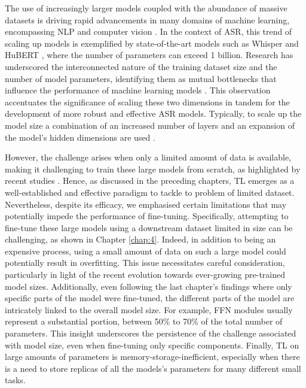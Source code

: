 \label{chap:5}
\cleardoublepage

The use of increasingly larger models coupled with the abundance of massive datasets is driving rapid advancements in many domains of machine learning, encompassing \ac{NLP} \cite{brown2020language} and computer vision \cite{ramesh2021zero}. In the context of \ac{ASR}, this trend of scaling up models is exemplified by state-of-the-art models such as Whisper \cite{radford2023robust} and HuBERT \cite{hsu2021hubert}, where the number of parameters can exceed 1 billion. Research has underscored the interconnected nature of the training dataset size and the number of model parameters, identifying them as mutual bottlenecks that influence the performance of machine learning models \cite{Kaplan2020ScalingLF}. This observation accentuates the significance of scaling these two dimensions in tandem for the development of more robust and effective \ac{ASR} models. Typically, to scale up the model size a combination of an increased number of layers and an expansion of the model's hidden dimensions are used \cite{zheng22d_interspeech}.

However, the challenge arises when only a limited amount of data is available, making it challenging to train these large models from scratch, as highlighted by recent studies \cite{sri_end2end, gelin2021endtoend}. Hence, as discussed in the preceding chapters, \ac{TL} emerges as a well-established and effective paradigm to tackle to problem of limited dataset. Nevertheless, despite its efficacy, we emphasised certain limitations that may potentially impede the performance of fine-tuning. Specifically, attempting to fine-tune these large models using a downstream dataset limited in size can be challenging, as shown in Chapter \ref{chap:4}. Indeed, in addition to being an expensive process, using a small amount of data on such a large model could potentially result in overfitting. This issue necessitates careful consideration, particularly in light of the recent evolution towards ever-growing pre-trained model sizes. Additionally, even following the last chapter's findings where only specific parts of the model were fine-tuned, the different parts of the model are intricately linked to the overall model size. For example, \ac{FFN} modules usually represent a substantial portion, between 50\% to  70\% of the total number of parameters. This insight underscores the persistence of the challenge associated with model size, even when fine-tuning only specific components. Finally, \ac{TL} on large amounts of parameters is memory-storage-inefficient, especially when there is a need to store replicas of all the models's parameters for many different small tasks.

